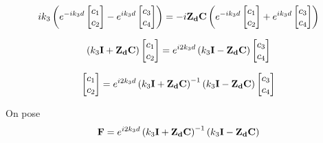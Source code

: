 \begin{equation}
    ik_3\left( e^{-ik_3 d}
    \begin{bmatrix}
        c_1 \\
        c_2
    \end{bmatrix}
    -e^{ik_3 d}
    \begin{bmatrix}
        c_3 \\
        c_4
    \end{bmatrix}
    \right)
    =-i\mathbf{Z_d}\mathbf{C}
    \left(
        e^{-ik_3 d}
        \begin{bmatrix}
            c_1 \\
            c_2
        \end{bmatrix}
        +e^{ik_3 d}
        \begin{bmatrix}
            c_3 \\
            c_4
        \end{bmatrix}
    \right)
\end{equation}

\begin{equation}
    \left(k_3\mathbf{I} + \mathbf{Z_d}\mathbf{C}\right)
    \begin{bmatrix}
        c_1 \\
        c_2
    \end{bmatrix}
    = e^{i2k_3 d} \left(k_3\mathbf{I} - \mathbf{Z_d}\mathbf{C}\right)
    \begin{bmatrix}
        c_3 \\
        c_4
    \end{bmatrix}
\end{equation}


\begin{equation}
    \begin{bmatrix}
        c_1 \\
        c_2
    \end{bmatrix}
    = e^{i2 k_3 d} \left(k_3\mathbf{I} + \mathbf{Z_d}\mathbf{C}\right)^{-1}\left(k_3\mathbf{I} - \mathbf{Z_d}\mathbf{C}\right)
    \begin{bmatrix}
        c_3 \\
        c_4
    \end{bmatrix}
\end{equation}

On pose 
\begin{equation}
    \mathbf{F} = e^{i2 k_3 d} \left(k_3\mathbf{I} + \mathbf{Z_d}\mathbf{C}\right)^{-1}\left(k_3\mathbf{I} - \mathbf{Z_d}\mathbf{C}\right)
\end{equation}


